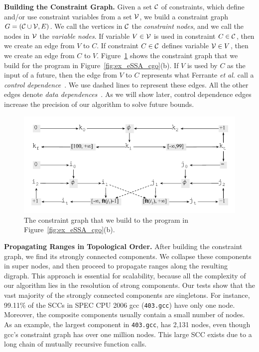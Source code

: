 \documentclass[preprint]{sigplanconf}[10pt]
\newcommand{\varset}[1]{\mbox{$\cal{#1}$}}
\begin{document}
\noindent
\textbf{Building the Constraint Graph. }
Given a set $\varset{C}$ of constraints, which define and/or use constraint
variables from a set $\varset{V}$, we build a constraint graph
$G = (\varset{C} \cup \varset{V}, E)$.
We call the vertices in \varset{C} the {\em constraint nodes}, and we call the
nodes in \varset{V} the {\em variable nodes}.
If variable $V \in \varset{V}$ is used in constraint $C \in \varset{C}$, then
we create an edge from $V$ to $C$.
If constraint $C \in \varset{C}$ defines variable $\varset{V} \in V$, then we
create an edge from $C$ to $V$.
Figure~\ref{fig:ex_graph} shows the constraint graph that we build for the
program in Figure~\ref{fig:ex_eSSA_cgo}(b).
If $V$ is used by $C$ as the input of a future, then the edge from
$V$ to $C$ represents what Ferrante {\em et al.} call a {\em control
dependence}~\cite[p.323]{Ferrante87}.
We use dashed lines to represent these edges.
All the other edges denote {\em data dependences}~\cite[p.322]{Ferrante87}.
As we will show later, control dependence edges increase the precision of our
algorithm to solve future bounds.

\begin{figure}[t!]
\begin{center}
\includegraphics[width=\columnwidth]{images/ex_graph}
\end{center}
\caption{\label{fig:ex_graph}
The constraint graph that we build to the program in
Figure~\ref{fig:ex_eSSA_cgo}(b).}
\end{figure}

\noindent
\textbf{Propagating Ranges in Topological Order. }
After building the constraint graph, we find its strongly connected components.
We collapse these components in super nodes, and then proceed to propagate
ranges along the resulting digraph.
This approach is essential for scalability, because all the complexity of our
algorithm lies in the resolution of strong components.
Our tests show that the vast majority of the strongly connected components are
singletons.
For instance, 99.11\% of the SCCs in SPEC CPU 2006 gcc (\texttt{403.gcc}) have
only one node.
Moreover, the composite components usually contain a small number of nodes.
As an example, the largest component in \texttt{403.gcc}, has 2,131 nodes,
even though gcc's constraint graph has over one million nodes.
This large SCC exists due to a long chain of mutually recursive function calls.
\end{document}
